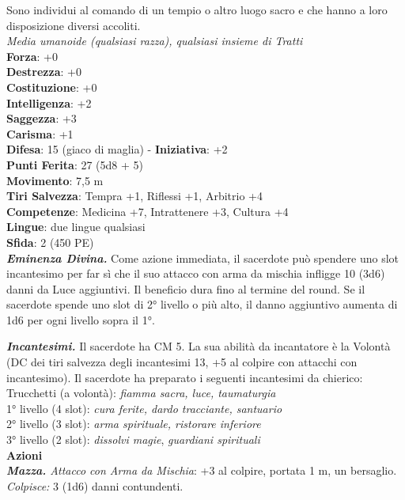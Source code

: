 \begin{multicols}{2}
Sono individui al comando di un tempio o altro luogo sacro e che hanno a loro disposizione diversi accoliti.\\
\emph{Media umanoide (qualsiasi razza), qualsiasi insieme di Tratti}\\
\textbf{Forza}: +0\\
\textbf{Destrezza}: +0\\
\textbf{Costituzione}: +0\\
\textbf{Intelligenza}: +2\\
\textbf{Saggezza}: +3\\
\textbf{Carisma}: +1\\
\textbf{Difesa}: 15 (giaco di maglia) - \textbf{Iniziativa}: +2\\
\textbf{Punti Ferita}: 27 (5d8 + 5)\\
\textbf{Movimento}: 7,5 m\\
\textbf{Tiri Salvezza}: Tempra +1, Riflessi +1, Arbitrio +4 \\
\textbf{Competenze}: Medicina +7, Intrattenere +3, Cultura +4\\
\textbf{Lingue}: due lingue qualsiasi\\
\textbf{Sfida}: 2 (450 PE)\smallskip\\
\emph{\textbf{Eminenza Divina.}} Come azione immediata, il sacerdote può spendere uno slot incantesimo per far sì che il suo attacco con arma da mischia infligge 10 (3d6) danni da Luce aggiuntivi. Il beneficio dura fino al termine del round. Se il sacerdote spende uno slot di 2° livello o più alto, il danno aggiuntivo aumenta di 1d6 per ogni livello sopra il 1°.

\emph{\textbf{Incantesimi.}} Il sacerdote ha CM 5. La sua abilità da incantatore è la Volontà (DC dei tiri salvezza degli incantesimi 13, +5 al colpire con attacchi con incantesimo). Il sacerdote ha preparato i seguenti incantesimi da chierico: \\
Trucchetti (a volontà): \emph{fiamma sacra, luce, taumaturgia}\\
1° livello (4 slot): \emph{cura ferite, dardo tracciante, santuario}\\
2° livello (3 slot): \emph{arma spirituale, ristorare inferiore}\\
3° livello (2 slot): \emph{dissolvi magie}, \emph{guardiani spirituali}\\
\smallskip\textbf{Azioni}\\
\emph{\textbf{Mazza.} Attacco con Arma da Mischia}: +3 al colpire, portata 1 m, un bersaglio.\\
\emph{Colpisce:} 3 (1d6) danni contundenti.\\


\end{multicols}
